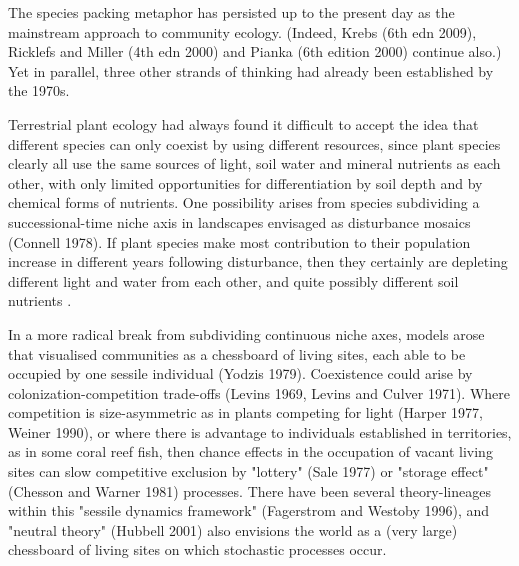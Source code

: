 \documentclass[a4paper,11pt]{article}
\begin{document}

The species packing metaphor has persisted up to the present day as the mainstream approach to community ecology. (Indeed,  Krebs (6th edn 2009), Ricklefs and Miller (4th edn 2000) and Pianka (6th edition 2000) continue also.) Yet in parallel, three other strands of thinking had already been established by the 1970s.

Terrestrial plant ecology had always found it difficult to accept the idea that different species can only coexist by using different resources, since plant species clearly all use the same sources of light, soil water and mineral nutrients as each other, with only limited opportunities for differentiation by soil depth and by chemical forms of nutrients. One possibility arises from species subdividing a successional-time niche axis in landscapes envisaged as disturbance mosaics (Connell 1978). If plant species make most contribution to their population increase in different years following disturbance, then they certainly are depleting different light and water from each other, and quite possibly different soil nutrients \citep{Huston-1987, Kohyama-1993}.

In a more radical break from subdividing continuous niche axes, models arose that visualised communities as a chessboard of living sites, each able to be occupied by one sessile individual (Yodzis 1979). Coexistence could arise by colonization-competition trade-offs (Levins 1969, Levins and Culver 1971). Where competition is size-asymmetric as in plants competing for light (Harper 1977, Weiner 1990), or where there is advantage to individuals established in territories, as in some coral reef fish, then chance effects in the occupation of vacant living sites can slow competitive exclusion by "lottery" (Sale 1977) or "storage effect" (Chesson and Warner 1981) processes. There have been several theory-lineages within this "sessile dynamics framework" (Fagerstrom and Westoby 1996), and "neutral theory" (Hubbell 2001) also envisions the world as a (very large) chessboard of living sites on which stochastic processes occur.
\end{document}
